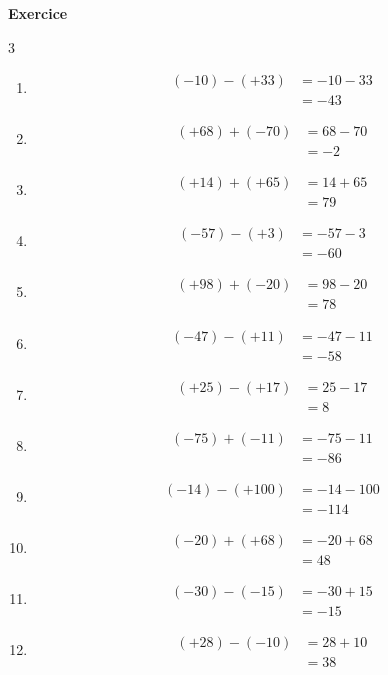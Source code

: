\documentclass[10pt,a4paper]{article}
\newcounter{nexo}
\begin{document}
\textbf{Exercice \thenexo} 
\begin{multicols}{3}
	\begin{enumerate}[label=\alph*)]
		\item \begin{align*}
			(-10)-(+33) &= -10-33\\ &= -43
		\end{align*}
		\item \begin{align*}
			(+68)+(-70) &= 68-70 \\ &=-2
		\end{align*}
		\item \begin{align*}
			(+14)+(+65) &= 14 + 65 \\ &= 79
		\end{align*}
		\item \begin{align*}
			(-57)-(+3) &= -57 - 3 \\ &= -60
		\end{align*}
		\item \begin{align*}
			(+98)+(-20) &= 98-20 \\ &=78
		\end{align*}
		\item \begin{align*}
			(-47)-(+11) &= -47 - 11 \\ &=-58
		\end{align*}
		\item \begin{align*}
			(+25)-(+17) &= 25 - 17 \\ &= 8
		\end{align*}
		\item \begin{align*}
			(-75)+(-11) &= -75 - 11 \\ &=-86
		\end{align*}
		\item \begin{align*}
			(-14) - (+100) &= -14 - 100 \\ &= -114
		\end{align*}
		\item \begin{align*}
			(-20) + (+68) &= -20+68 \\ &= 48
		\end{align*}
		\item \begin{align*}
			(-30)-(-15) &= -30 + 15 \\ &= -15
		\end{align*}
		\item \begin{align*}
			(+28)-(-10) &= 28 + 10 \\ &=38
		\end{align*}
	\end{enumerate}
\end{multicols}
\end{document}
